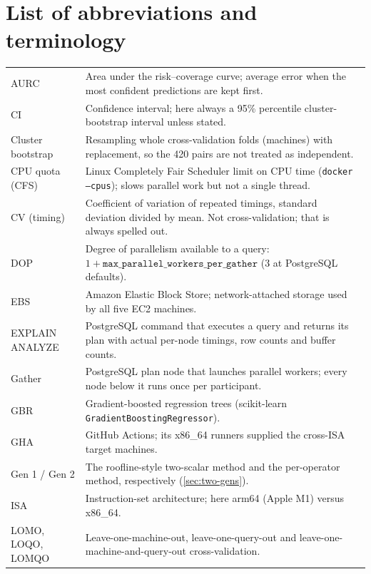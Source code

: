\chapter*{List of abbreviations and terminology}
\small
\begin{longtable}{@{}L{2.6cm}L{12.3cm}@{}}
\toprule {} & \\ \midrule \endhead
AURC & Area under the risk--coverage curve; average error when the most confident predictions are kept first.\\
CI & Confidence interval; here always a 95\% percentile cluster-bootstrap interval unless stated.\\
Cluster bootstrap & Resampling whole cross-validation folds (machines) with replacement, so the 420 pairs are not treated as independent.\\
CPU quota (CFS) & Linux Completely Fair Scheduler limit on CPU time (\texttt{docker --cpus}); slows parallel work but not a single thread.\\
CV (timing) & Coefficient of variation of repeated timings, standard deviation divided by mean. Not cross-validation; that is always spelled out.\\
DOP & Degree of parallelism available to a query: $1+\texttt{max\_parallel\_workers\_per\_gather}$ (3 at PostgreSQL defaults).\\
EBS & Amazon Elastic Block Store; network-attached storage used by all five EC2 machines.\\
EXPLAIN ANALYZE & PostgreSQL command that executes a query and returns its plan with actual per-node timings, row counts and buffer counts.\\
Gather & PostgreSQL plan node that launches parallel workers; every node below it runs once per participant.\\
GBR & Gradient-boosted regression trees (scikit-learn \texttt{GradientBoostingRegressor}).\\
GHA & GitHub Actions; its x86\_64 runners supplied the cross-ISA target machines.\\
Gen 1 / Gen 2 & The roofline-style two-scalar method and the per-operator method, respectively (\cref{sec:two-gens}).\\
ISA & Instruction-set architecture; here arm64 (Apple M1) versus x86\_64.\\
LOMO, LOQO, LOMQO & Leave-one-machine-out, leave-one-query-out and leave-one-machine-and-query-out cross-validation.\\

\end{longtable}
